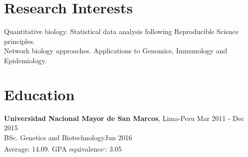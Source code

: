 \documentclass[margin,line]{res}
\begin{document}
\address{Calle Tambo Huascar 201, San Miguel, Lima-Peru}
\address{\textit{contact:} avallecam@gmail.com or (+51)950951722}

\begin{resume}

\vspace*{.15in}

\section{\sc Research Interests}%


Quantitative biology. Statistical data analysis following Reproducible Science principles.\\Network biology approaches. Applications to Genomics, Immunology and Epidemiology.%



\section{\sc Education}
{\bf Universidad Nacional Mayor de San Marcos}, Lima-Peru \hfill Mar 2011 - Dec 2015\\
BSc. Genetics and Biotechnology\hfill Jun 2016\\
Average: 14.09. GPA equivalence\footnotemark\textsuperscript{,}\footnotemark: 3.05\\%


\end{resume}
\end{document}
